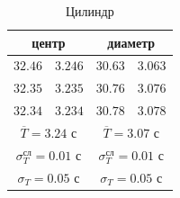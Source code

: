 \documentclass[a4paper,12pt]{article}
\begin{document}
\begin{enumerate}
    \begin{table}[!h]
        \centering
        \begin{tabular}{|c|c|c|c|} \hline
            \multicolumn{2}{|c}{центр} & \multicolumn{2}{|c|}{диаметр} \\ \hline
            $32.46$ & $3.246$ & $30.63$ & $3.063$ \\ \hline
            $32.35$ & $3.235$ & $30.76$ & $3.076$ \\ \hline
            $32.34$ & $3.234$ & $30.78$ & $3.078$ \\ \hline
            \multicolumn{2}{|c|}{$\overline{T} = 3.24$ с} & \multicolumn{2}{|c|}{$\overline{T} = 3.07$ с} \\ 
            \multicolumn{2}{|c|}{$\sigma_T^{\text{сл}} = 0.01$ с} & \multicolumn{2}{|c|}{$\sigma_T^{\text{сл}} = 0.01$ с} \\
            \multicolumn{2}{|c|}{$\sigma_T = 0.05$ с} & \multicolumn{2}{|c|}{$\sigma_T = 0.05$ с} \\ \hline
        \end{tabular}
        \caption{Цилиндр}
    \end{table}
	

\end{enumerate}
\end{document}
